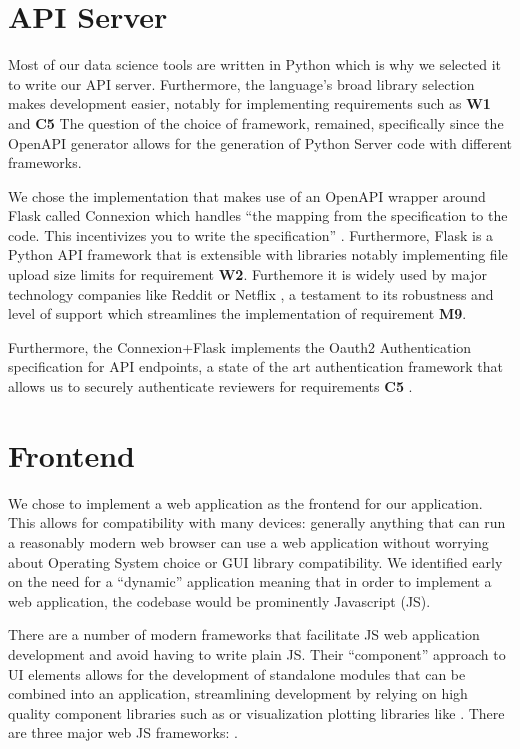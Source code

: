 \documentclass{l4proj}
\begin{document}
\section{API Server}

Most of our data science tools are written in Python which is why we selected it to write our API server.
Furthermore, the language's broad library selection makes development easier, notably for implementing requirements such as \textbf{W1} and \textbf{C5}
The question of the choice of framework, remained, specifically since the OpenAPI generator allows for the generation of Python Server code with different frameworks.

We chose the implementation that makes use of an OpenAPI wrapper around Flask called Connexion which handles ``the mapping from the specification to the code.
This incentivizes you to write the specification'' \autocite{ZalandoConnexion2020}.
Furthermore, Flask is a Python API framework that is extensible with libraries notably implementing file upload size limits for requirement \textbf{W2}. Furthemore it is widely used by major technology companies like Reddit or Netflix \autocite{WhyDevelopersFlask}, a testament to its robustness and level of support which streamlines the implementation of requirement \textbf{M9}.

Furthermore, the Connexion+Flask implements the Oauth2 Authentication specification for API endpoints, a state of the art authentication framework that allows us to securely authenticate reviewers for requirements \textbf{C5} \autocite{jonesOAuthAuthorizationFramework2012}.

\section{Frontend}

We chose to implement a web application as the frontend for our application.
This allows for compatibility with many devices: generally anything that can run a reasonably modern web browser can use a web application without worrying about Operating System choice or GUI library compatibility.
We identified early on the need for a ``dynamic'' application meaning that in order to implement a web application, the codebase would be prominently Javascript (JS).

There are a number of modern frameworks that facilitate JS web application development and avoid having to write plain JS.
Their ``component'' approach to UI elements allows for the development of standalone modules that can be combined into an application, streamlining development by relying on high quality component libraries such as \textcite{MuiorgMaterialui2020} or visualization plotting libraries like \textcite{RechartsRecharts2020}.
There are three major web JS frameworks: \textcite{AngularAngular2020,FacebookReact2020,VuejsVue2020}.
\end{document}
